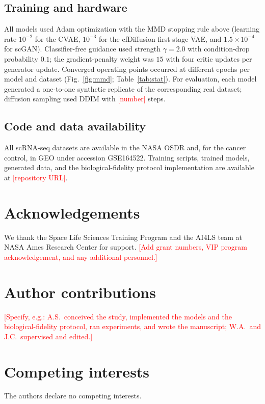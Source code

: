 \documentclass[11pt]{article}
\newcommand{\protname}{biological-fidelity protocol}
\newcommand{\res}[1]{\textcolor{red}{[#1]}}
\begin{document}
\subsection{Training and hardware}
All models used Adam optimization with the MMD stopping rule above (learning rate $10^{-2}$ for the CVAE, $10^{-3}$ for the cfDiffusion first-stage VAE, and $1.5\times10^{-4}$ for scGAN). Classifier-free guidance used strength $\gamma=2.0$ with condition-drop probability $0.1$; the gradient-penalty weight was $15$ with four critic updates per generator update. Converged operating points occurred at different epochs per model and dataset (Fig.~\ref{fig:mmd}; Table~\ref{tab:stat}). For evaluation, each model generated a one-to-one synthetic replicate of the corresponding real dataset; diffusion sampling used DDIM with \res{number} steps.

\subsection{Code and data availability}
All scRNA-seq datasets are available in the NASA OSDR \cite{osdr} and, for the cancer control, in GEO under accession GSE164522. Training scripts, trained models, generated data, and the \protname{} implementation are available at \res{repository URL}.

\section*{Acknowledgements}
We thank the Space Life Sciences Training Program and the AI4LS team at NASA Ames Research Center for support. \res{Add grant numbers, VIP program acknowledgement, and any additional personnel.}

\section*{Author contributions}
\res{Specify, e.g.: A.S.\ conceived the study, implemented the models and the biological-fidelity protocol, ran experiments, and wrote the manuscript; W.A.\ and J.C.\ supervised and edited.}

\section*{Competing interests}
The authors declare no competing interests.
\end{document}
